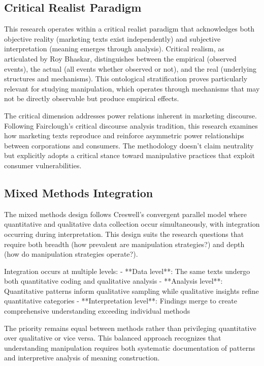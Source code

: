 \subsection{Critical Realist Paradigm}

This research operates within a critical realist paradigm that acknowledges both objective reality (marketing texts exist independently) and subjective interpretation (meaning emerges through analysis). Critical realism, as articulated by Roy Bhaskar, distinguishes between the empirical (observed events), the actual (all events whether observed or not), and the real (underlying structures and mechanisms). This ontological stratification proves particularly relevant for studying manipulation, which operates through mechanisms that may not be directly observable but produce empirical effects.

The critical dimension addresses power relations inherent in marketing discourse. Following Fairclough's critical discourse analysis tradition, this research examines how marketing texts reproduce and reinforce asymmetric power relationships between corporations and consumers. The methodology doesn't claim neutrality but explicitly adopts a critical stance toward manipulative practices that exploit consumer vulnerabilities.

\subsection{Mixed Methods Integration}

The mixed methods design follows Creswell's convergent parallel model where quantitative and qualitative data collection occur simultaneously, with integration occurring during interpretation. This design suits the research questions that require both breadth (how prevalent are manipulation strategies?) and depth (how do manipulation strategies operate?).

Integration occurs at multiple levels:
- **Data level**: The same texts undergo both quantitative coding and qualitative analysis
- **Analysis level**: Quantitative patterns inform qualitative sampling while qualitative insights refine quantitative categories
- **Interpretation level**: Findings merge to create comprehensive understanding exceeding individual methods

The priority remains equal between methods rather than privileging quantitative over qualitative or vice versa. This balanced approach recognizes that understanding manipulation requires both systematic documentation of patterns and interpretive analysis of meaning construction.

